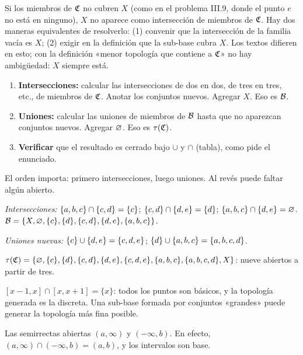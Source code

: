 \begin{ojo}[¿Y el conjunto $X$?]
Si los miembros de $\mathfrak{C}$ no cubren $X$ (como en el problema III.9, donde el punto $e$ no está en ninguno), $X$ no
aparece como intersección de miembros de $\mathfrak{C}$. Hay dos maneras equivalentes de resolverlo: (1) convenir que la
intersección de la familia vacía es $X$; (2) exigir en la definición que la sub-base cubra $X$. Los textos difieren en
esto; con la definición «menor topología que contiene a $\mathfrak{C}$» no hay ambigüedad: $X$ siempre está.
\end{ojo}

\begin{metodo}
\begin{enumerate}[leftmargin=1.6em]
\item \textbf{Intersecciones:} calcular las intersecciones de dos en dos, de tres en tres, etc., de miembros de $\mathfrak{C}$.
Anotar los conjuntos nuevos. Agregar $X$. Eso es $\mathcal{B}$.
\item \textbf{Uniones:} calcular las uniones de miembros de $\mathcal{B}$ hasta que no aparezcan conjuntos nuevos. Agregar
$\varnothing$. Eso es $\tau(\mathfrak{C})$.
\item \textbf{Verificar} que el resultado es cerrado bajo $\cup$ y $\cap$ (tabla), como pide el enunciado.
\end{enumerate}
El orden importa: primero intersecciones, luego uniones. Al revés puede faltar algún abierto.
\end{metodo}

\begin{ejemplo}[Ejemplo: problema III.8, $\C=\{\s{a,b,c},\s{c,d},\s{d,e}\}$ en $X=\s{a,b,c,d,e}$]
\emph{Intersecciones:} $\{a,b,c\}\cap\{c,d\}=\{c\}$; $\{c,d\}\cap\{d,e\}=\{d\}$; $\{a,b,c\}\cap\{d,e\}=\varnothing$.
$\mathcal{B}=\{X,\varnothing,\{c\},\{d\},\{c,d\},\{d,e\},\{a,b,c\}\}$.

\emph{Uniones nuevas:} $\{c\}\cup\{d,e\}=\{c,d,e\}$; $\{d\}\cup\{a,b,c\}=\{a,b,c,d\}$.

$\tau(\mathfrak{C})=\{\varnothing,\{c\},\{d\},\{c,d\},\{d,e\},\{c,d,e\},\{a,b,c\},\{a,b,c,d\},X\}$: nueve abiertos a partir de tres.
\end{ejemplo}
\begin{ejemplo}[{Ejemplo: problema III.11, $\C=\{[a,a+1]:a\in\R\}$}]
$[x-1,x]\cap[x,x+1]=\{x\}$: todos los puntos son básicos, y la topología generada es la discreta. Una sub-base formada
por conjuntos «grandes» puede generar la topología más fina posible.
\end{ejemplo}
\begin{ejemplo}
Las semirrectas abiertas $(a,\infty)$ y $(-\infty,b)$. En efecto, $(a,\infty)\cap(-\infty,b)=(a,b)$, y los intervalos
son base.
\end{ejemplo}


